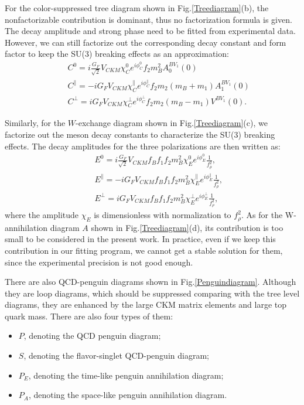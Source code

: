 \documentclass[11pt]{article}
\begin{document}
For the color-suppressed tree diagram shown in Fig.\ref{Treediagram}(b), the nonfactorizable contribution   is dominant, thus no factorization formula is given. The decay amplitude and strong phase need to be fitted from experimental data. However, we can still factorize out the  corresponding decay constant and form factor to keep  the SU(3) breaking effects  as an approximation:
\begin{eqnarray}
&&{ C}^0=i\frac{G_F}{\sqrt 2}V_{CKM}\chi_C^0 e^{i \phi^0_C}f_2m_B^2A_0^{BV_1}(0) \\
&&{ C}^\parallel=-iG_FV_{CKM}\chi_C^\parallel e^{i \phi^\parallel_C}f_2m_2 \left(m_B+m_1\right) A_1^{BV_1}(0) \\
&&{ C}^\perp=iG_FV_{CKM}\chi_C^\perp e^{i \phi^\perp_C}f_2m_2\left(m_B-m_1\right)V^{BV_1}(0).
\end{eqnarray}

Similarly, for the   $W$-exchange diagram shown in Fig.\ref{Treediagram}(c), we factorize out the meson decay constants to characterize  the SU(3) breaking effects. The  decay amplitudes for the three polarizations  are then written as:
\begin{eqnarray}
&&{E}^0=i\frac{G_F}{\sqrt 2}V_{CKM}f_Bf_1f_2m_B^2\chi_E^0e^{i \phi^0_E}\frac{1}{f_\rho^2},\\
&&{E}^\parallel=-iG_FV_{CKM}f_Bf_1f_2m_B^2\chi_E^\parallel e^{i \phi^\parallel_E}\frac{1}{f_\rho^2}, \\
&&{ E}^\perp=iG_FV_{CKM}f_Bf_1f_2m_B^2\chi_E^\perp e^{i \phi^\perp_E}\frac{1}{f_\rho^2},
\end{eqnarray}
where the amplitude $\chi_E$ is dimensionless with normalization to $f_\rho^2$.  As for the W-annihilation diagram $A$ shown in Fig.\ref{Treediagram}(d), its contribution is too small to be considered in the present work.
 In practice, even if we keep this contribution in our fitting program,  we cannot get a stable solution for them, since the  experimental precision is not good enough.

There are also   QCD-penguin  diagrams shown in Fig.\ref{Penguindiagram}. Although they are loop diagrams, which should be suppressed comparing with the tree level diagrams, they are enhanced by the large CKM matrix elements and large top quark mass. There are also four types of them:
 \begin{itemize}
    \item $P$, denoting the QCD penguin diagram;
  \item $S$, denoting the flavor-singlet QCD-penguin diagram;
  \item $P_E$, denoting the time-like penguin annihilation diagram;
  \item $P_A$, denoting the  space-like penguin annihilation diagram.
\end{itemize}
\end{document}
